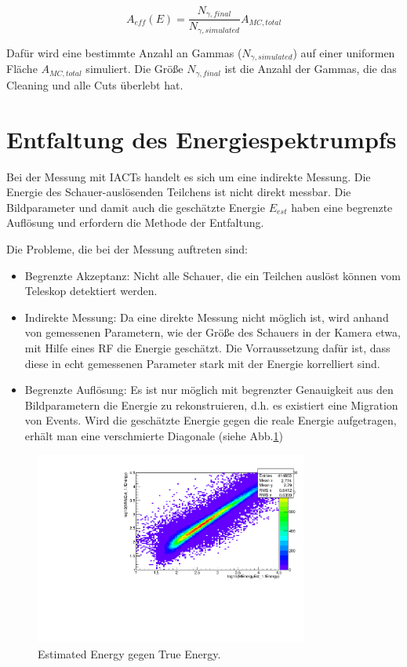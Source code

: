 \begin{equation}
 A_{eff}(E)=\frac{N_{\gamma, final}}{N_{\gamma, simulated}}A_{MC, total}
\end{equation}

Dafür wird eine bestimmte Anzahl an Gammas ($N_{\gamma, simulated}$) auf einer uniformen Fläche $A_{MC,total}$ simuliert. 
Die Größe $N_{\gamma, final}$ ist die Anzahl der Gammas, die das Cleaning und alle Cuts überlebt hat.


\section{Entfaltung des Energiespektrumpfs}
Bei der Messung mit IACTs handelt es sich um eine indirekte Messung.
Die Energie des Schauer-auslösenden Teilchens ist nicht direkt messbar.
Die Bildparameter und damit auch die geschätzte Energie $E_{est}$ haben eine begrenzte Auflösung und erfordern die Methode der Entfaltung.

Die Probleme, die bei der Messung auftreten sind:

\begin{itemize}
 \item Begrenzte Akzeptanz: Nicht alle Schauer, die ein Teilchen auslöst können vom Teleskop detektiert werden.
 \item Indirekte Messung: Da eine direkte Messung nicht möglich ist, wird anhand von gemessenen Parametern, wie der Größe des Schauers in der Kamera etwa, mit Hilfe eines RF die Energie geschätzt.
       Die Vorraussetzung dafür ist, dass diese in echt gemessenen Parameter stark mit der Energie korrelliert sind.
 \item Begrenzte Auflösung: Es ist nur möglich mit begrenzter Genauigkeit aus den Bildparametern die Energie zu rekonstruieren, d.h. es existiert eine Migration von Events.
       Wird die geschätzte Energie gegen die reale Energie aufgetragen, erhält man eine verschmierte Diagonale (siehe Abb.\ref{EnergyEst_EnergyTrue})
\end{itemize}

\begin{figure}
    \centering
    \includegraphics[width=0.8\textwidth]{./Plots/EnergyEst_EnergyTrue.pdf}
    \caption{Estimated Energy gegen True Energy.}
    \label{EnergyEst_EnergyTrue}
\end{figure}

